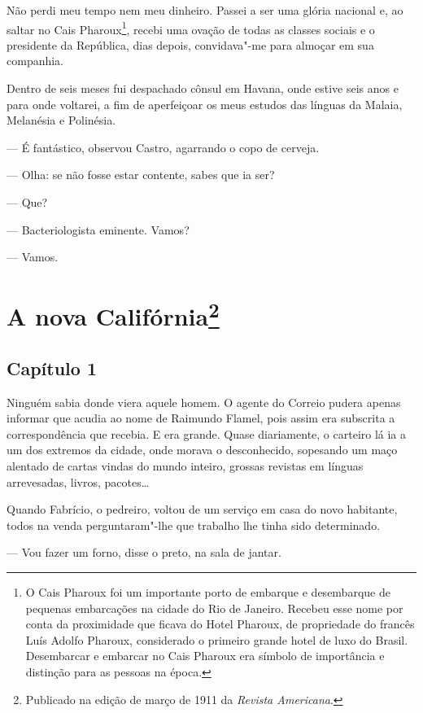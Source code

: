 Não perdi meu tempo nem meu dinheiro. Passei a ser uma glória nacional
e, ao saltar no Cais Pharoux\footnote{O Cais Pharoux foi um importante
  porto de embarque e desembarque de pequenas embarcações na cidade do
  Rio de Janeiro. Recebeu esse nome por conta da proximidade que ficava
  do Hotel Pharoux, de propriedade do francês Luís Adolfo Pharoux,
  considerado o primeiro grande hotel de luxo do Brasil. Desembarcar e
  embarcar no Cais Pharoux era símbolo de importância e distinção para
  as pessoas na época.}, recebi uma ovação de todas as classes sociais e
o presidente da República, dias depois, convidava"-me para almoçar em sua
companhia.

Dentro de seis meses fui despachado cônsul em Havana, onde estive seis
anos e para onde voltarei, a fim de aperfeiçoar os meus estudos das
línguas da Malaia, Melanésia e Polinésia.

--- É fantástico, observou Castro, agarrando o copo de cerveja.

--- Olha: se não fosse estar contente, sabes que ia ser?

--- Que?

--- Bacteriologista eminente. Vamos?

--- Vamos.



\chapter[A nova Califórnia]{A nova Califórnia\footnote[*]{Publicado na edição de março de 1911 da \emph{Revista Americana}.}}

\section{Capítulo 1}

\noindent{}Ninguém sabia donde viera aquele homem. O agente do Correio pudera
apenas informar que acudia ao nome de Raimundo Flamel, pois assim era
subscrita a correspondência que recebia. E era grande. Quase
diariamente, o carteiro lá ia a um dos extremos da cidade, onde morava o
desconhecido, sopesando um maço alentado de cartas vindas do mundo
inteiro, grossas revistas em línguas arrevesadas, livros, pacotes\ldots{}

Quando Fabrício, o pedreiro, voltou de um serviço em casa do novo
habitante, todos na venda perguntaram"-lhe que trabalho lhe tinha sido
determinado.

--- Vou fazer um forno, disse o preto, na sala de jantar.


